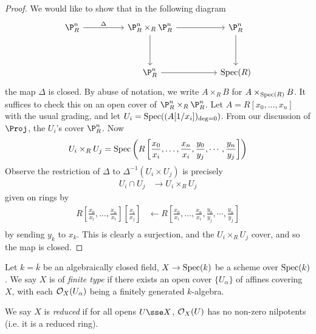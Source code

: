 \documentclass{article}
\begin{document}
\begin{proof}
     We would like to show that in the following diagram
\[\begin{tikzcd}
	{\P^n_R} && {\P^n_R\times_R\P^n_R} && {\P^n_R} \\
	\\
	&& {\P^n_R} && {\Spec(R)}
	\arrow["\Delta", from=1-1, to=1-3]
	\arrow[from=1-3, to=3-3]
	\arrow[from=1-3, to=1-5]
	\arrow[from=1-5, to=3-5]
	\arrow[from=3-3, to=3-5]
\end{tikzcd}\]
    the map \(\Delta\) is closed. By abuse of notation, we write \(A \times_R B\) for \(A \times_{\operatorname{Spec}(R)} B\). It suffices to check this on an open cover of \(\P^n_R \times_R \P^n_R\). Let \(A = R[x_0, \dots, x_n]\) with the usual grading, and let \(U_i = \operatorname{Spec}((A[1/x_i])_{\deg = 0})\). From our discussion of \(\Proj\), the \(U_i\)'s cover \(\P^n_R\). Now
    \[U_i \times_R U_j = \operatorname{Spec}\left(R\left[\frac{x_0}{x_i}, \dots, \frac{x_n}{x_i}, \frac{y_0}{y_j}, \cdots, \frac{y_n}{y_j}\right]\right)\]
    Observe the restriction of \(\Delta\) to \(\Delta^{-1}(U_i \times U_j)\) is precisely
    \begin{align*}
        U_i \cap U_j &\to U_i \times_R U_j
    \end{align*}
    given on rings by
    \begin{align*}
        R\left[\frac{x_0}{x_i}, \dots, \frac{x_n}{x_i}\right]\left[\frac{x_i}{x_j}\right]&\leftarrow R\left[\frac{x_0}{x_i}, \dots, \frac{x_n}{x_i}, \frac{y_0}{y_j}, \cdots, \frac{y_n}{y_j}\right] \\
    \end{align*}
    by sending \(y_k\) to \(x_k\). This is clearly a surjection, and the \(U_i \times_R U_j\) cover, and so the map is closed. 
\end{proof}

Let \(k = \overline{k}\) be an algebraically closed field, \(X \to \operatorname{Spec}(k)\) be a scheme over \(\operatorname{Spec}(k)\). We say \(X\) is of \emph{finite type} if there exists an open cover \(\{U_\alpha\}\) of affines covering \(X\), with each \(\mathcal{O}_X(U_\alpha)\) being a finitely generated \(k\)-algebra.

We say \(X\) is \emph{reduced} if for all opens \(U \sse X\), \(\mathcal{O}_X(U)\) has no non-zero nilpotents (i.e. it is a reduced ring).
\end{document}
